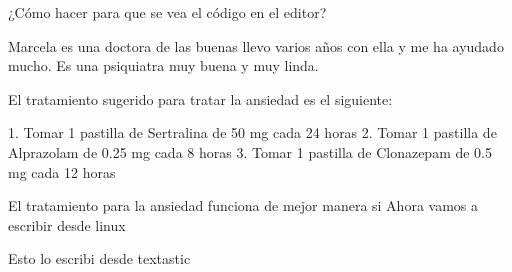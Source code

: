 \documentclass{article}
\begin{document}
¿Cómo hacer para que se vea el código en el editor?


Marcela es una doctora de las buenas llevo varios años con ella y me ha ayudado mucho. Es una psiquiatra muy buena y muy linda.



El tratamiento sugerido para tratar la ansiedad es el siguiente:

1. Tomar 1 pastilla de Sertralina de 50 mg cada 24 horas
2. Tomar 1 pastilla de Alprazolam de 0.25 mg cada 8 horas
3. Tomar 1 pastilla de Clonazepam de 0.5 mg cada 12 horas

El tratamiento para la ansiedad funciona de mejor manera si 
Ahora vamos a escribir desde linux



Esto lo escribi desde textastic
\end{document}
